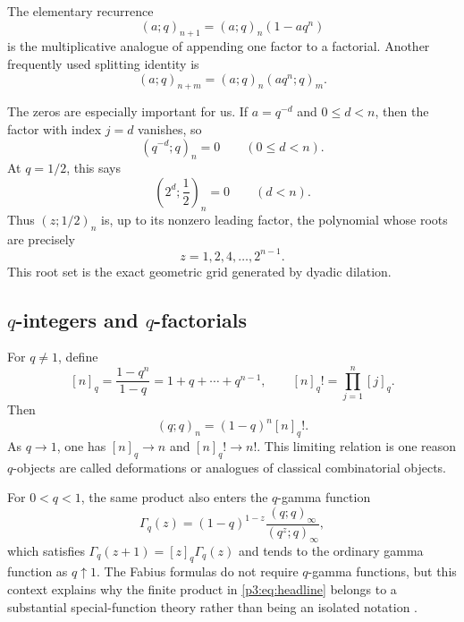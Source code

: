 \documentclass[11pt,oneside]{article}
\theoremstyle{definition}
\theoremstyle{remark}
\newcommand{\qpoch}[3]{\left(#1;#2\right)_{#3}}
\begin{document}
The elementary recurrence
\begin{equation}\label{p3:eq:qpochrec}
 \qpoch{a}{q}{n+1}=\qpoch{a}{q}{n}(1-aq^n)
\end{equation}
is the multiplicative analogue of appending one factor to a factorial.  Another frequently used splitting identity is
\begin{equation}\label{p3:eq:qpochsplit}
 \qpoch{a}{q}{n+m}=\qpoch{a}{q}{n}\qpoch{aq^n}{q}{m}.
\end{equation}

The zeros are especially important for us.  If $a=q^{-d}$ and $0\le d<n$, then the factor with index $j=d$ vanishes, so
\begin{equation}\label{p3:eq:qpochzero}
 \qpoch{q^{-d}}{q}{n}=0\qquad(0\le d<n).
\end{equation}
At $q=1/2$, this says
\begin{equation}\label{p3:eq:halfzeros}
 \qpoch{2^d}{\frac12}{n}=0\qquad(d<n).
\end{equation}
Thus $\qpoch{z}{1/2}{n}$ is, up to its nonzero leading factor, the polynomial whose roots are precisely
\[
  z=1,2,4,\ldots,2^{n-1}.
\]
This root set is the exact geometric grid generated by dyadic dilation.

\subsection{\texorpdfstring{$q$-integers and $q$-factorials}{q-integers and q-factorials}}

For $q\ne1$, define
\begin{equation}\label{p3:eq:qinteger}
 [n]_q=\frac{1-q^n}{1-q}=1+q+\cdots+q^{n-1},
 \qquad
 [n]_q!=\prod_{j=1}^{n}[j]_q.
\end{equation}
Then
\begin{equation}\label{p3:eq:qfactorialpoch}
 \qpoch{q}{q}{n}=(1-q)^n[n]_q!.
\end{equation}
As $q\to1$, one has $[n]_q\to n$ and $[n]_q!\to n!$.  This limiting relation is one reason $q$-objects are called deformations or analogues of classical combinatorial objects.

For $0<q<1$, the same product also enters the $q$-gamma function
\begin{equation}\label{p3:eq:qgamma}
 \Gamma_q(z)=(1-q)^{1-z}
 \frac{\qpoch{q}{q}{\infty}}{\qpoch{q^z}{q}{\infty}},
\end{equation}
which satisfies $\Gamma_q(z+1)=[z]_q\Gamma_q(z)$ and tends to the ordinary gamma function as $q\uparrow1$.  The Fabius formulas do not require $q$-gamma functions, but this context explains why the finite product in \eqref{p3:eq:headline} belongs to a substantial special-function theory rather than being an isolated notation \cite{p3:DLMF17,p3:GasperRahman,p3:KacCheung}.
\end{document}
